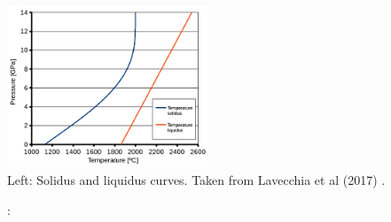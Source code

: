 \begin{center}
\includegraphics[width=6cm]{images/phasetransitions/latb17}\\
{\captionfont Left: Solidus and liquidus curves. 
Taken from Lavecchia et al (2017) \cite{latb17}.} 
\end{center}




\Literature: \cite{scyt75}
